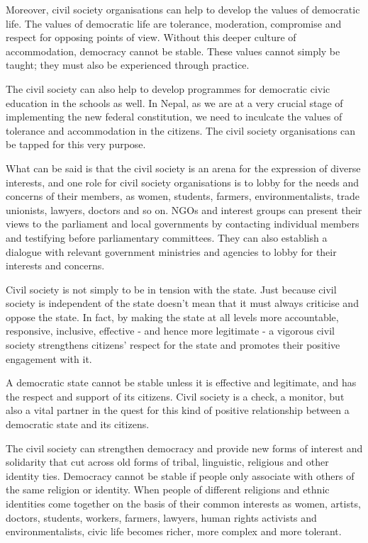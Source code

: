 \documentclass[
  openany]{book}
\begin{document}
\begin{questions}
Moreover,  civil society organisations can help to develop the  values of democratic life. The values of democratic life are tolerance, moderation, compromise and respect for opposing points of view. Without this deeper culture of accommodation, democracy cannot be stable. These values cannot simply be taught; they must also be experienced through practice.

The civil society can also help to develop programmes for democratic civic education in the schools as well. In Nepal, as we are at a very crucial stage of implementing the new  federal constitution, we need to inculcate the values of tolerance and accommodation in the citizens. The civil society organisations can be tapped for this very purpose.

What can be said is that the  civil society is an arena for the expression of diverse interests, and one role for civil society organisations is to lobby for the needs and concerns of their members, as women, students, farmers, environmentalists, trade unionists, lawyers, doctors and so on. NGOs and interest groups can present their views to the parliament and local governments by contacting individual members and testifying before parliamentary committees. They can also establish a dialogue with relevant government ministries and agencies to lobby for their interests and concerns.

Civil society is not simply to be in tension with the state. Just because civil society is independent of the state doesn't mean that it must always criticise and oppose the state. In fact, by making the state at all levels more accountable, responsive, inclusive, effective - and hence more legitimate - a vigorous civil society strengthens citizens' respect for the state and promotes their positive engagement with it.

A democratic state cannot be stable unless it is effective and legitimate, and has the respect and support of its citizens.  Civil society is a check, a monitor, but also a vital partner in the quest for this kind of positive relationship between a democratic state and its citizens.

The  civil society can strengthen democracy and provide new forms of interest and solidarity that cut across old forms of tribal, linguistic, religious and other identity ties. Democracy cannot be stable if people only associate with others of the same religion or identity. When people of different religions and ethnic identities come together on the basis of their common interests as women, artists, doctors, students, workers, farmers, lawyers, human rights activists and environmentalists, civic life becomes richer, more complex and more tolerant.


\end{questions}
\end{document}
